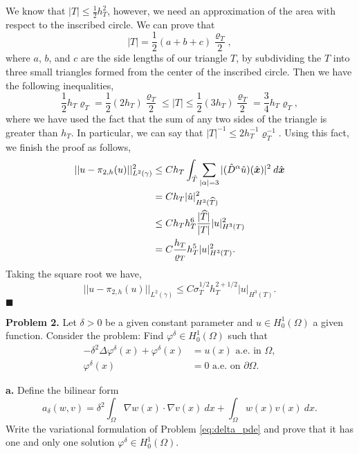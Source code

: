 \documentclass[11pt]{article}
\newcommand{\bs}{\boldsymbol}
\begin{document}
We know that $|T| \leq \frac{1}{2}h_T^2$, however, we need an approximation of the area with respect to the inscribed circle.
We can prove that
\begin{equation}
    |T| = \frac{1}{2}(a + b + c) \frac{\varrho_T}{2},
\end{equation}
where $a$, $b$, and $c$ are the side lengths of our triangle $T$, by subdividing the $T$ into three small triangles formed from the center of the inscribed circle.
Then we have the following inequalities,
\begin{equation*}
    \frac{1}{2}h_T \varrho_T = \frac{1}{2}(2 h_T) \frac{\varrho_T}{2} \leq |T| \leq \frac{1}{2}(3 h_T) \frac{\varrho_T}{2} = \frac{3}{4} h_T \varrho_T,
\end{equation*}
where we have used the fact that the sum of any two sides of the triangle is greater than $h_T$.
In particular, we can say that $|T|^{-1} \leq 2h_T^{-1} \varrho^{-1}_T$.
Using this fact, we finish the proof as follows,
\begin{align*}
	||u - \pi_{2,h}(u)||^2_{L^2(\gamma)} &\leq Ch_T \int_{\Hat{T}} \sum_{|\alpha| = 3} |(\Hat{D}^\alpha \Hat{u})(\Hat{\bs{x}})|^2 \: d\Hat{\bs{x}} \\
	&= C h_T |\hat{u}|^2_{H^3(\widehat{T})} \\
	&\leq C h_T h_T^6 \frac{|\widehat{T}|}{|T|} |u|^2_{H^3(T)} \\
    	&= C \frac{h_T}{\varrho_T} h_T^5 |u|^2_{H^3(T)}.
\end{align*}
Taking the square root we have,
\begin{equation*}
    ||u - \pi_{2,h}(u)||_{L^2(\gamma)} \leq C \sigma_T^{1/2} h_T^{2 + 1/2} |u|_{H^3(T)}. 
\end{equation*}
$\blacksquare$


\vskip 2cm


\textbf{Problem 2.} Let $\delta > 0$ be a given constant parameter and $u\in H^1_0(\Omega)$ a given function.
Consider the problem: Find $\varphi^\delta\in H^1_0(\Omega)$ such that
\begin{equation} 
\begin{split} \label{eq:delta_pde}
    -\delta^2 \Delta \varphi^\delta(x) + \varphi^\delta(x) &= u(x) \text{ a.e. in } \Omega, \\
    \varphi^\delta(x) &= 0 \text{ a.e. on } \partial \Omega.
\end{split}
\end{equation}


\vskip 1cm

\textbf{a.} Define the bilinear form 
\begin{equation} 
    a_\delta(w, v) = \delta^2 \int_\Omega \nabla w(x) \cdot \nabla v(x) \: dx + \int_\Omega w(x) v(x) \: dx.
\end{equation}
Write the variational formulation of Problem \eqref{eq:delta_pde} and prove that it has one and only one solution $\varphi^\delta \in H^1_0(\Omega)$.
\end{document}
